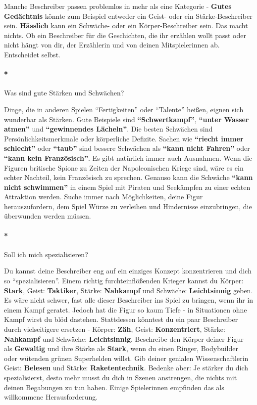 \documentclass[]{article}
\let\oldparagraph\paragraph
\renewcommand{\paragraph}[1]{\oldparagraph{#1}\mbox{}}
\begin{document}
Manche Beschreiber passen problemlos in mehr als eine Kategorie -
\textbf{Gutes Gedächtnis} könnte zum Beispiel entweder ein Geist- oder
ein Stärke-Beschreiber sein. \textbf{Hässlich} kann ein Schwäche- oder
ein Körper-Beschreiber sein. Das macht nichts. Ob ein Beschreiber für
die Geschichten, die ihr erzählen wollt passt oder nicht hängt von dir,
der Erzählerin und von deinen Mitspielerinnen ab. Entscheidet selbst.

\paragraph*{Was sind gute Stärken und
Schwächen?}\label{was-sind-gute-stuxe4rken-und-schwuxe4chen}

Dinge, die in anderen Spielen ``Fertigkeiten'' oder ``Talente'' heißen,
eignen sich wunderbar als Stärken. Gute Beispiele sind
\textbf{``Schwertkampf''}, \textbf{``unter Wasser atmen''} und
\textbf{``gewinnendes Lächeln''}. Die besten Schwächen sind
Persönlichkeitsmerkmale oder körperliche Defizite. Sachen wie
\textbf{``riecht immer schlecht''} oder \textbf{``taub''} sind bessere
Schwächen als \textbf{``kann nicht Fahren''} oder \textbf{``kann kein
Französisch''}. Es gibt natürlich immer auch Ausnahmen. Wenn die Figuren
britische Spione zu Zeiten der Napoleonischen Kriege sind, wäre es ein
echter Nachteil, kein Französisch zu sprechen. Genauso kann die Schwäche
\textbf{``kann nicht schwimmen''} in einem Spiel mit Piraten und
Seekämpfen zu einer echten Attraktion werden. Suche immer nach
Möglichkeiten, deine Figur herauszufordern, dem Spiel Würze zu verleihen
und Hindernisse einzubringen, die überwunden werden müssen.

\paragraph*{Soll ich mich
spezialisieren?}\label{soll-ich-mich-spezialisieren}

Du kannst deine Beschreiber eng auf ein einziges Konzept konzentrieren
und dich so ``spezialisieren''. Einem richtig furchteinflößenden Krieger
kannst du Körper: \textbf{Stark}, Geist: \textbf{Taktiker}, Stärke:
\textbf{Nahkampf} und Schwäche: \textbf{Leichtsinnig} geben. Es wäre
nicht schwer, fast alle dieser Beschreiber ins Spiel zu bringen, wenn
ihr in einem Kampf geratet. Jedoch hat die Figur so kaum Tiefe - in
Situationen ohne Kampf wirst du blöd dastehen. Stattdessen könntest du
ein paar Beschreiber durch vielseitigere ersetzen - Körper:
\textbf{Zäh}, Geist: \textbf{Konzentriert}, Stärke: \textbf{Nahkampf}
und Schwäche: \textbf{Leichtsinnig}. Beschreibe den Körper deiner Figur
als \textbf{Gewaltig} und ihre Stärke als \textbf{Stark}, wenn du einen
Ringer, Bodybuilder oder wütenden grünen Superhelden willst. Gib deiner
genialen Wissenschaftlerin Geist: \textbf{Belesen} und Stärke:
\textbf{Raketentechnik}. Bedenke aber: Je stärker du dich
spezialisierst, desto mehr musst du dich in Szenen anstrengen, die
nichts mit deinen Begabungen zu tun haben. Einige Spielerinnen empfinden
das als willkommene Herausforderung.
\end{document}

